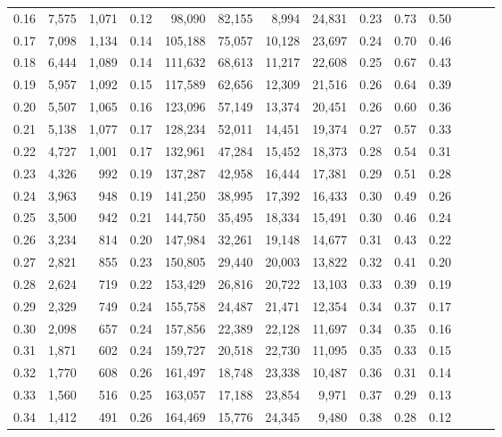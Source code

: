 \begin{tabular}{rrrrrrrrrrrrrr}
0.16 &  7,575 &  1,071 &  0.12 &   98,090 &   82,155 &   8,994 &  24,831 &  0.23 &  0.73 &      0.50 \\
0.17 &  7,098 &  1,134 &  0.14 &  105,188 &   75,057 &  10,128 &  23,697 &  0.24 &  0.70 &      0.46 \\
0.18 &  6,444 &  1,089 &  0.14 &  111,632 &   68,613 &  11,217 &  22,608 &  0.25 &  0.67 &      0.43 \\
0.19 &  5,957 &  1,092 &  0.15 &  117,589 &   62,656 &  12,309 &  21,516 &  0.26 &  0.64 &      0.39 \\
0.20 &  5,507 &  1,065 &  0.16 &  123,096 &   57,149 &  13,374 &  20,451 &  0.26 &  0.60 &      0.36 \\
0.21 &  5,138 &  1,077 &  0.17 &  128,234 &   52,011 &  14,451 &  19,374 &  0.27 &  0.57 &      0.33 \\
0.22 &  4,727 &  1,001 &  0.17 &  132,961 &   47,284 &  15,452 &  18,373 &  0.28 &  0.54 &      0.31 \\
0.23 &  4,326 &    992 &  0.19 &  137,287 &   42,958 &  16,444 &  17,381 &  0.29 &  0.51 &      0.28 \\
0.24 &  3,963 &    948 &  0.19 &  141,250 &   38,995 &  17,392 &  16,433 &  0.30 &  0.49 &      0.26 \\
0.25 &  3,500 &    942 &  0.21 &  144,750 &   35,495 &  18,334 &  15,491 &  0.30 &  0.46 &      0.24 \\
0.26 &  3,234 &    814 &  0.20 &  147,984 &   32,261 &  19,148 &  14,677 &  0.31 &  0.43 &      0.22 \\
0.27 &  2,821 &    855 &  0.23 &  150,805 &   29,440 &  20,003 &  13,822 &  0.32 &  0.41 &      0.20 \\
0.28 &  2,624 &    719 &  0.22 &  153,429 &   26,816 &  20,722 &  13,103 &  0.33 &  0.39 &      0.19 \\
0.29 &  2,329 &    749 &  0.24 &  155,758 &   24,487 &  21,471 &  12,354 &  0.34 &  0.37 &      0.17 \\
0.30 &  2,098 &    657 &  0.24 &  157,856 &   22,389 &  22,128 &  11,697 &  0.34 &  0.35 &      0.16 \\
0.31 &  1,871 &    602 &  0.24 &  159,727 &   20,518 &  22,730 &  11,095 &  0.35 &  0.33 &      0.15 \\
0.32 &  1,770 &    608 &  0.26 &  161,497 &   18,748 &  23,338 &  10,487 &  0.36 &  0.31 &      0.14 \\
0.33 &  1,560 &    516 &  0.25 &  163,057 &   17,188 &  23,854 &   9,971 &  0.37 &  0.29 &      0.13 \\
0.34 &  1,412 &    491 &  0.26 &  164,469 &   15,776 &  24,345 &   9,480 &  0.38 &  0.28 &      0.12 \\

\end{tabular}
